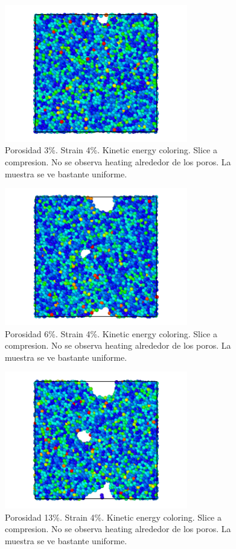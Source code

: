 \documentclass[10pt, oneside]{article} %
\begin{document}
\begin{figure}[H]
\centering
\includegraphics[width=8cm]{Figures/Porosidad/porosidad_3_kinetic_4strain.png}
\caption{Porosidad 3\%. Strain 4\%. Kinetic energy coloring. Slice a compresion. No se observa heating alrededor de los poros. La muestra se ve bastante uniforme.}
\end{figure}

\begin{figure}[H]
\centering
\includegraphics[width=8cm]{Figures/Porosidad/porosidad_6_kinetic_4strain.png}
\caption{Porosidad 6\%. Strain 4\%. Kinetic energy coloring. Slice a compresion. No se observa heating alrededor de los poros. La muestra se ve bastante uniforme.}
\end{figure}

\begin{figure}[H]
\centering
\includegraphics[width=8cm]{Figures/Porosidad/porosidad_13_kinetic_4strain.png}
\caption{Porosidad 13\%. Strain 4\%. Kinetic energy coloring. Slice a compresion. No se observa heating alrededor de los poros. La muestra se ve bastante uniforme.}
\end{figure}
\end{document}
